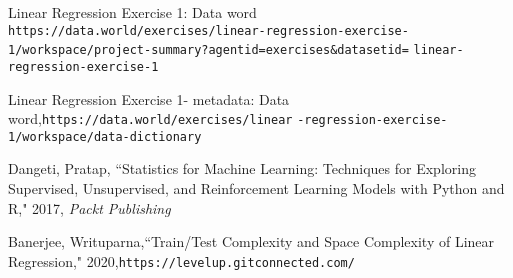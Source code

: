 \documentclass[twocolumn]{article}
\begin{document}
{\footnotesize
\begin{thebibliography}{100} %

Linear Regression Exercise 1: Data word \texttt{https://data.world/exercises/linear-regression-exercise-}
\texttt{1/workspace/project-summary?agentid=exercises&datasetid=}
\texttt{linear-regression-exercise-1}

Linear Regression Exercise 1- metadata: Data word,\texttt{https://data.world/exercises/linear}
\texttt{-regression-exercise-1/workspace/data-dictionary}

 Dangeti, Pratap, ``Statistics for Machine Learning: Techniques for Exploring Supervised, Unsupervised, and Reinforcement Learning Models with Python and R," 2017, \emph{Packt Publishing}

Banerjee, Writuparna,``Train/Test Complexity and Space Complexity of Linear Regression," 2020,\texttt{https://levelup.gitconnected.com/}

\end{thebibliography}
}
\end{document}
